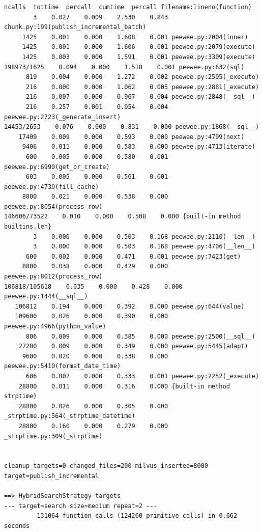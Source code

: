 \documentclass[a4paper,12pt]{article}
\begin{document}
\begin{lstlisting}[basicstyle=\ttfamily\fontsize{9}{9}\selectfont]
   ncalls  tottime  percall  cumtime  percall filename:lineno(function)
        3    0.027    0.009    2.530    0.843 chunk.py:199(publish_incremental_batch)
     1425    0.001    0.000    1.608    0.001 peewee.py:2004(inner)
     1425    0.001    0.000    1.606    0.001 peewee.py:2079(execute)
     1425    0.003    0.000    1.591    0.001 peewee.py:3309(execute)
198973/1625    0.094    0.000    1.518    0.001 peewee.py:632(sql)
      819    0.004    0.000    1.272    0.002 peewee.py:2595(_execute)
      216    0.000    0.000    1.062    0.005 peewee.py:2881(_execute)
      216    0.007    0.000    0.967    0.004 peewee.py:2848(__sql__)
      216    0.257    0.001    0.954    0.004 peewee.py:2723(_generate_insert)
14453/2653    0.076    0.000    0.831    0.000 peewee.py:1868(__sql__)
    17409    0.009    0.000    0.593    0.000 peewee.py:4799(next)
     9406    0.011    0.000    0.583    0.000 peewee.py:4713(iterate)
      600    0.005    0.000    0.580    0.001 peewee.py:6990(get_or_create)
      603    0.005    0.000    0.561    0.001 peewee.py:4739(fill_cache)
     8800    0.021    0.000    0.538    0.000 peewee.py:8054(process_row)
146606/73522    0.010    0.000    0.508    0.000 {built-in method builtins.len}
        3    0.000    0.000    0.503    0.168 peewee.py:2110(__len__)
        3    0.000    0.000    0.503    0.168 peewee.py:4706(__len__)
      600    0.002    0.000    0.471    0.001 peewee.py:7423(get)
     8800    0.038    0.000    0.429    0.000 peewee.py:8012(process_row)
106818/105618    0.035    0.000    0.428    0.000 peewee.py:1444(__sql__)
   106812    0.194    0.000    0.392    0.000 peewee.py:644(value)
   109600    0.026    0.000    0.390    0.000 peewee.py:4966(python_value)
      806    0.009    0.000    0.385    0.000 peewee.py:2500(__sql__)
    27200    0.009    0.000    0.349    0.000 peewee.py:5445(adapt)
     9600    0.020    0.000    0.338    0.000 peewee.py:5410(format_date_time)
      606    0.002    0.000    0.333    0.001 peewee.py:2252(_execute)
    28800    0.011    0.000    0.316    0.000 {built-in method strptime}
    28800    0.026    0.000    0.305    0.000 _strptime.py:564(_strptime_datetime)
    28800    0.160    0.000    0.279    0.000 _strptime.py:309(_strptime)


cleanup_targets=0 changed_files=200 milvus_inserted=8000 target=publish_incremental

==> HybridSearchStrategy targets
--- target=search size=medium repeat=2 ---
         131064 function calls (124260 primitive calls) in 0.062 seconds


\end{lstlisting}
\end{document}

